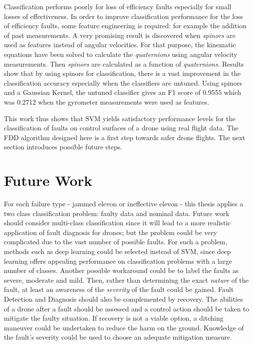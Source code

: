 Classification performs poorly for loss of efficiency faults especially for small losses of effectiveness. 
In order to improve classification performance for the loss of efficiency faults, some feature engineering is required: for example the addition of past measurements. A very promising result is discovered when \emph{spinors} are used as features instead of angular velocities. For that purpose, the kinematic equations have been solved to calculate the \emph{quaternions} using angular velocity measurements. Then \emph{spinors} are calculated as a function of \emph{quaternions}. Results show that by using spinors for classification, there is a vast improvement in the classification accuracy especially when the classifiers are untuned. Using spinors and a Gaussian Kernel, the untuned classifier gives an F1 score of 0.9555 which was 0.2712 when the gyrometer measurements were used as features. 

This work thus shows that SVM yields satisfactory performance levels for the classification of faults on control surfaces of a drone using real flight data. The FDD algorithm designed here is a first step towards safer drone flights. The next section introduces possible future steps. 

\section{Future Work}

For each failure type - jammed elevon or ineffective elevon - this thesis applies a two class classification problem: faulty data and nominal data. 
Future work should consider multi-class classification since it will lead to a more realistic application of fault diagnosis for drones; but the problem could be very complicated due to the vast number of possible faults. 
For such a problem, methods such as deep learning could be selected instead of SVM, since deep learning offers appealing performance on classification problems with a large number of classes. 
Another possible workaround could be to label the faults as severe, moderate and mild. Then, rather than determining the exact  \emph{nature} of the fault, at least an awareness of the  \emph{severity} of the fault could be gained.
Fault Detection and Diagnosis should also be complemented by recovery. The abilities of a drone after a fault should be assessed and a control action should be taken to mitigate the faulty situation. If recovery is not a viable option, a ditching maneuver could be undertaken to reduce the harm on the ground. Knowledge of the fault's severity could be used to choose an adequate mitigation measure.
